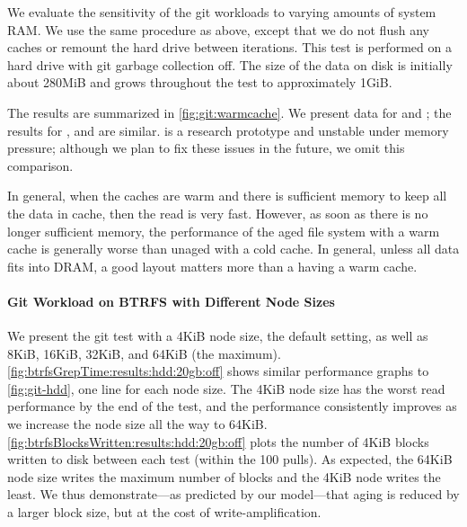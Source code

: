 We evaluate the sensitivity of the git workloads to varying amounts of system
RAM.  We use the same procedure as above, except that we do not flush any
caches or remount the hard drive between iterations.  This test is performed on
a hard drive with git garbage collection off.  The size of the data on disk is
initially about 280MiB and grows throughout the test to approximately 1GiB.



The results are summarized in \cref{fig:git:warmcache}. We present data for \ext
and \ftwofs; the results for \btrfs, \xfs and \zfs are similar. \betrfs is a
research prototype and unstable under memory pressure; although we plan to fix
these issues in the future, we omit this comparison. 

In general, when the caches are warm and there is sufficient memory to keep all
the data in cache, then the read is very fast. However, as soon as there is no
longer sufficient memory, the performance of the aged file system with a warm
cache is generally worse than unaged with a cold cache.  In general, unless all
data fits into DRAM, a good layout matters more than a having a warm cache.

\paragraph{Git Workload on BTRFS with Different Node Sizes}
We present the git test with a 4KiB node size, the default setting, as well as
8KiB, 16KiB, 32KiB, and 64KiB (the maximum).
\cref{fig:btrfsGrepTime:results:hdd:20gb:off} shows similar performance graphs
to \cref{fig:git-hdd}, one line for each node size.  The 4KiB node size has
the worst read performance by the end of the test, and the performance
consistently improves as we increase the node size all the way to 64KiB.
\cref{fig:btrfsBlocksWritten:results:hdd:20gb:off} plots the number of 4KiB
blocks written to disk between each test (within the 100 pulls).  As expected,
the 64KiB node size writes the maximum number of blocks and the 4KiB node
writes the least.  We thus demonstrate---as predicted by our model---that aging
is reduced by a larger block size, but at the cost of write-amplification.


